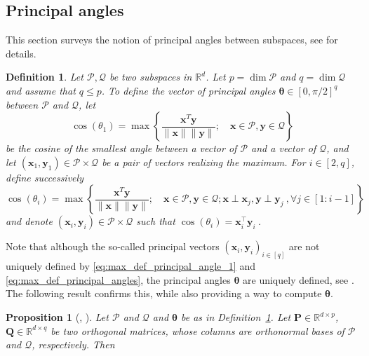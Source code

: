 \documentclass[twoside,11pt]{book}
\newtheorem{proposition}{Proposition}
\newtheorem{definition}{Definition}
\numberwithin{theorem}{chapter}
\numberwithin{definition}{chapter}
\numberwithin{proposition}{chapter}
\numberwithin{corollary}{chapter}
\numberwithin{example}{chapter}
\numberwithin{lemma}{chapter}
\numberwithin{assumption}{chapter}
\numberwithin{equation}{chapter}
\numberwithin{figure}{chapter}
\DeclareMathOperator{\Tran}{\intercal}
\begin{document}
\begin{subappendices}
\subsection{Principal angles}
This section surveys the notion of principal angles between subspaces, see \cite[Section 6.4.3]{GoVa96} for details.
\begin{definition}
  \label{d:angles}
Let $\mathcal{P},\mathcal{Q}$ be two subspaces in $\mathbb{R}^{d}$. Let $p= \dim\mathcal{P}$ and $q = \dim\mathcal{Q}$ and assume that $q \leq p$. To define the vector of principal angles $\bm{\theta} \in [0,\pi/2]^{q}$ between $\mathcal{P}$ and $\mathcal{Q}$, let
\begin{equation}\label{eq:max_def_principal_angle_1}
 \cos(\theta_{1}) = \max \left\{ \frac{\bm{x}^{T}\bm{y}}{\|\bm{x}\|\|\bm{y}\|}; \quad \bm{x} \in \mathcal{P}, \bm{y} \in \mathcal{Q} \right\}
\end{equation}
be the cosine of the smallest angle between a vector of $\mathcal{P}$ and a vector of $\mathcal{Q}$, and let $(\bm{x}_{1},\bm{y}_{1}) \in \mathcal{P}\times \mathcal{Q}$ be a pair of vectors realizing the maximum. For $i \in [2,q]$, define successively
\begin{equation}\label{eq:max_def_principal_angles}
 \cos(\theta_{i}) = \max \left\{\frac{\bm{x}^{T}\bm{y}}{\|\bm{x}\|\|\bm{y}\|}; \quad \bm{x} \in \mathcal{P}, \bm{y} \in \mathcal{Q}; \bm{x} \perp \bm{x}_{j}, \bm{y} \perp \bm{y}_{j}\:, \forall j \in [1:i-1] \right\}
\end{equation}
and denote $(\bm{x}_{i},\bm{y}_{i}) \in \mathcal{P}\times\mathcal{Q}$ such that $\cos(\theta_{i}) = \bm{x}_{i}^{\Tran}\bm{y}_{i} \:$.
\end{definition}
Note that although the so-called principal vectors $(\bm{x}_{i},\bm{y}_{i})_{i \in [q]}$
are not uniquely defined by \eqref{eq:max_def_principal_angle_1} and \eqref{eq:max_def_principal_angles}, the principal angles $\bm{\theta}$ are uniquely defined, see \parencite{BjGo73}. The following result confirms this, while also providing a way to compute $\bm{\theta}$.
\begin{proposition}[\citealp{BjGo73}, \citealp{Ben92}]
  \label{principal_angles_theorem_1}
Let $\mathcal{P}$ and $\mathcal{Q}$ and $\bm{\theta}$ be as in Definition~\ref{d:angles}. Let $\bm{P} \in \mathbb{R}^{d \times p}$, $\bm{Q} \in \mathbb{R}^{d \times q}$ be two orthogonal matrices, whose columns are orthonormal bases of $\mathcal{P}$ and $\mathcal{Q}$, respectively. Then
\begin{equation}

\end{equation}
\end{proposition}
\end{subappendices}
\end{document}
